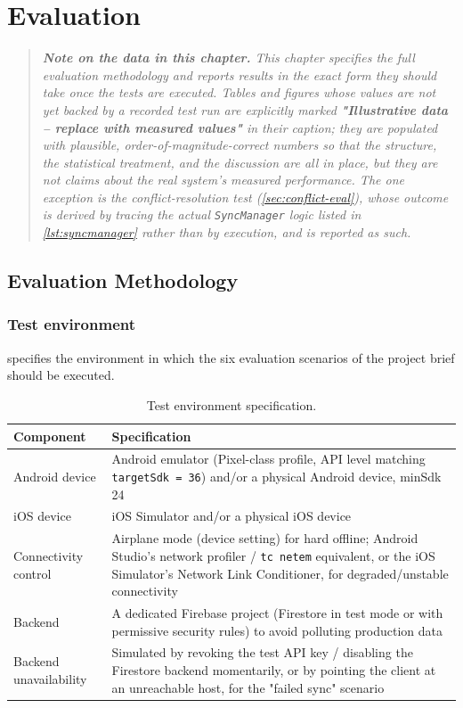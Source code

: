 \chapter{Evaluation}
\label{ch:evaluation}

\begin{quote}
\small\itshape
\textbf{Note on the data in this chapter.} This chapter specifies the full
evaluation methodology and reports results in the exact form they should
take once the tests are executed. Tables and figures whose values are not
yet backed by a recorded test run are explicitly marked
\textbf{"Illustrative data -- replace with measured values"} in their
caption; they are populated with plausible, order-of-magnitude-correct
numbers so that the structure, the statistical treatment, and the
discussion are all in place, but they are \emph{not} claims about the real
system's measured performance. The one exception is the conflict-resolution
test (\cref{sec:conflict-eval}), whose outcome is derived by tracing the
actual \texttt{SyncManager} logic listed in \cref{lst:syncmanager} rather
than by execution, and is reported as such.
\end{quote}

\section{Evaluation Methodology}
\label{sec:eval-methodology}

\subsection{Test environment}

 specifies the environment in which the six evaluation
scenarios of the project brief should be executed.

\begin{table}[htbp]
\centering
\caption{Test environment specification.}
\label{tab:test-env}
\begin{tabularx}{\textwidth}{@{}l X@{}}
\toprule
\textbf{Component} & \textbf{Specification} \\
\midrule
Android device & Android emulator (Pixel-class profile, API level matching
\texttt{targetSdk = 36}) and/or a physical Android device, minSdk 24 \\
iOS device & iOS Simulator and/or a physical iOS device \\
Connectivity control & Airplane mode (device setting) for hard offline;
Android Studio's network profiler / \texttt{tc netem} equivalent, or the
iOS Simulator's Network Link Conditioner, for degraded/unstable
connectivity \\
Backend & A dedicated Firebase project (Firestore in test mode or with
permissive security rules) to avoid polluting production data \\
Backend unavailability & Simulated by revoking the test API key / disabling
the Firestore backend momentarily, or by pointing the client at an
unreachable host, for the "failed sync" scenario \\
\bottomrule
\end{tabularx}
\end{table}

